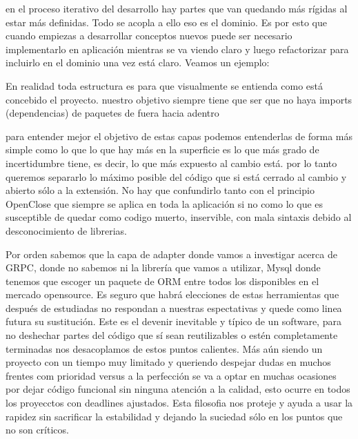 en el proceso iterativo del desarrollo hay partes que van quedando más rígidas al estar más definidas. Todo se acopla a ello eso es el dominio. Es por esto que cuando empiezas a desarrollar conceptos nuevos puede ser necesario implementarlo en aplicación mientras se va viendo claro y luego refactorizar para incluirlo en el dominio una vez está claro.
Veamos un ejemplo:

\begin{figure}[H]
    
    \caption{}
    \label{fig:ProjectfolderStructure}
\end{figure}

En realidad toda estructura es para que visualmente se entienda como está concebido el proyecto. nuestro objetivo siempre tiene que ser que no haya imports (dependencias) de paquetes de fuera hacia adentro


para entender mejor el objetivo de estas capas podemos entenderlas de forma más simple como lo que lo que hay más en la superficie es lo que más grado de incertidumbre tiene, es decir, lo que más expuesto al cambio está. por lo tanto queremos separarlo lo máximo posible del código que si está cerrado al cambio y abierto sólo a la extensión. No hay que confundirlo tanto con el principio OpenClose que siempre se aplica en toda la aplicación si no como lo que es susceptible de quedar como codigo muerto, inservible, con mala sintaxis debido al desconocimiento de librerias.

Por orden sabemos que la capa de adapter donde vamos a investigar acerca de GRPC, donde no sabemos ni la librería que vamos a utilizar, Mysql donde tenemos que escoger un paquete de ORM entre todos los disponibles en el mercado opensource. Es seguro que habrá elecciones de estas herramientas que después de estudiadas no respondan a nuestras espectativas y quede como linea futura su sustitución. Este es el devenir inevitable y típico de un software, para no deshechar partes del código que sí sean reutilizables o estén completamente terminadas nos desacoplamos de estos puntos calientes. Más aún siendo un proyecto con un tiempo muy limitado y queriendo despejar dudas en muchos frentes com prioridad versus a la perfección se va a optar en muchas ocasiones por dejar código funcional sin ninguna atención a la calidad, esto ocurre en todos los proyecctos con deadlines ajustados. Esta filosofia nos proteje y ayuda a usar la rapidez sin sacrificar la estabilidad y dejando la suciedad sólo en los puntos que no son críticos.


